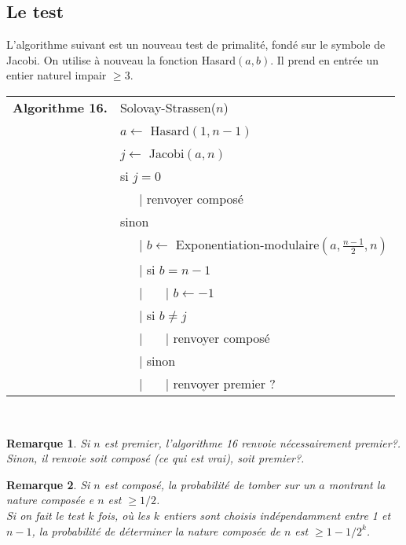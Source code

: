 \documentclass[10pt,a4paper]{report}
\newtheorem*{rem}{Remarque}
\begin{document}
\subsection{Le test}

L'algorithme suivant est un nouveau test de primalité, fondé sur le symbole de Jacobi. On utilise à nouveau la fonction Hasard$(a,b)$. Il prend en entrée un entier naturel impair $\geqslant 3$.\\



\begin{tabular}{ll}
\textbf{Algorithme 16.} & Solovay-Strassen($n$)\\
           & $a \leftarrow$ Hasard$(1,n-1)$  \\
           & $j \leftarrow$ Jacobi$(a,n)$ \\
           &  si $j=0$  \\
           & \ \ \ {\rm |} renvoyer composé \\
           &  sinon  \\
           & \ \ \ {\rm |}  $b \leftarrow $ Exponentiation-modulaire$(a,\tfrac{n-1}{2},n)$ \\
           & \ \ \ {\rm |} si $b=n-1$ \\
           & \ \ \ {\rm |} \ \ \ {\rm |} $b \leftarrow -1$ \\
           & \ \ \ {\rm |} si $b\neq j$\\
           &   \ \ \ {\rm |} \ \ \ {\rm |} renvoyer composé \\           
           & \ \ \ {\rm |} sinon \\
           & \ \ \ {\rm |} \ \ \ {\rm |} renvoyer premier ?
\end{tabular}\\

\begin{rem}
Si $n$ est premier, l'algorithme 16 renvoie nécessairement premier?. Sinon, il renvoie soit composé (ce qui est vrai), soit premier?. 
\end{rem}

\begin{rem}
Si $n$ est composé, la probabilité de tomber sur un $a$ montrant la nature composée e $n$ est $\geqslant 1/2$. \\
Si on fait le test $k$ fois, où les $k$ entiers sont choisis indépendamment entre 1 et $n-1$, la probabilité de déterminer la nature composée de $n$ est $\geqslant 1-1/2^k$.
\end{rem}
\end{document}
